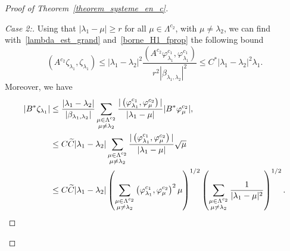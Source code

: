 \documentclass[11pt]{article}
\theoremstyle{definition}
\numberwithin{equation}{section}
\numberwithin{figure}{section}
\numberwithin{table}{section}
\newenvironment{step}[1]{\begin{proof}[#1]}{\let\qed\relax\end{proof}}
\newcommand{\fprop}[2]{\varphi^{#1}_{#2}}
\let\oldtilde\tilde
\renewcommand*{\tilde}[1]{\mathchoice{\widetilde{#1}}{\widetilde{#1}}{\oldtilde{#1}}{\oldtilde{#1}}}\let\oldexists\exists
\renewcommand*{\exists}{\mathrel{\oldexists}}
\begin{document}
\begin{proof}[Proof of Theorem~\ref{theorem_systeme_en_c}]
\begin{step}{Case 2:}
Using that $|\lambda_1-\mu|\geq r$ for all $\mu\in \Lambda^{c_2}$, with $\mu\neq \lambda_2$, we can find with~\eqref{lambda_est_grand} and~\eqref{borne_H1_fprop} the following bound
\begin{equation}\label{borne_chi_lambda1}
\left(A^{c_2} \zeta_{\lambda_1},\zeta_{\lambda_1}\right) \leq |\lambda_1-\lambda_2|^2 \frac{\left(A^{c_2} \fprop{c_1}{\lambda_1}, \fprop{c_1}{\lambda_1}\right)}{r^2|\beta_{\lambda_1,\lambda_2}|^2} \leq C^* |\lambda_1-\lambda_2|^2 \lambda_1.
\end{equation}
Moreover, we have
\begin{align*}
|B^* \zeta_{\lambda_1}| & \leq \frac{|\lambda_1-\lambda_2|}{|\beta_{\lambda_1,\lambda_2}|} \sum_{\substack{\mu\in \Lambda^{c_2}\\ \mu\neq \lambda_2}} \frac{|\left(\fprop{c_1}{\lambda_1}, \fprop{c_2}{\mu}\right)|}{|\lambda_1-\mu|} |B^* \fprop{c_2}{\mu}|, \\
& \leq C \tilde{C} |\lambda_1-\lambda_2| \sum_{\substack{\mu\in \Lambda^{c_2}\\ \mu\neq \lambda_2}} \frac{|\left(\fprop{c_1}{\lambda_1}, \fprop{c_2}{\mu}\right)|}{|\lambda_1-\mu|} \sqrt{\mu} \\
& \leq C \tilde{C} |\lambda_1-\lambda_2| \left(\sum_{\substack{\mu\in \Lambda^{c_2}\\ \mu\neq \lambda_2}} \left(\fprop{c_1}{\lambda_1}, \fprop{c_2}{\mu}\right)^2\mu \right)^{1/2} \left(\sum_{\substack{\mu\in \Lambda^{c_2}\\ \mu\neq \lambda_2}} \frac{1}{|\lambda_1-\mu|^2} \right)^{1/2}.
\end{align*}


\end{step}
\end{proof}
\end{document}
